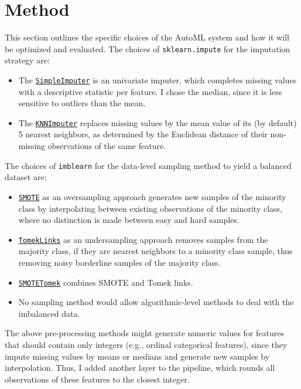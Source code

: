 \documentclass[11pt]{article}
\begin{document}
\section{Method}

This section outlines the specific choices of the AutoML system and how it will be optimized and evaluated. The choices of \texttt{sklearn.impute} for the imputation strategy are:
\begin{itemize}
\item The \href{https://scikit-learn.org/stable/modules/generated/sklearn.impute.SimpleImputer.html}{\texttt{SimpleImputer}} is an univariate imputer, which completes missing values with a descriptive statistic per feature. I chose the median, since it is less sensitive to outliers than the mean.
\item The \href{https://scikit-learn.org/stable/modules/generated/sklearn.impute.KNNImputer.html#sklearn.impute.KNNImputer}{\texttt{KNNImputer}} replaces missing values by the mean value of its (by default) 5 nearest neighbors, as determined by the Euclidean distance of their non-missing observations of the same feature. 
\end{itemize}

The choices of \texttt{imblearn} for the data-level sampling method to yield a balanced dataset are:
\begin{itemize}
\item \href{https://imbalanced-learn.org/stable/references/generated/imblearn.over_sampling.SMOTE.html}{\texttt{SMOTE}} as an oversampling approach generates new samples of the minority class by interpolating between existing observations of the minority class, where no distinction is made between easy and hard samples. 
\item \href{https://imbalanced-learn.org/stable/references/generated/imblearn.under_sampling.TomekLinks.html}{\texttt{TomekLinks}} as an undersampling approach removes samples from the majority class, if they are nearest neighbors to a minority class sample, thus removing noisy borderline samples of the majority class. 
\item \href{https://imbalanced-learn.org/stable/references/generated/imblearn.combine.SMOTETomek.html}{\texttt{SMOTETomek}} combines SMOTE and Tomek links.
\item No sampling method would allow algorithmic-level methods to deal with the imbalanced data. 
\end{itemize}

The above pre-processing methods might generate numeric values for features that should contain only integers (e.g., ordinal categorical features), since they impute missing values by means or medians and generate new samples by interpolation. Thus, I added another layer to the pipeline, which rounds all observations of these features to the closest integer. \\
\end{document}
